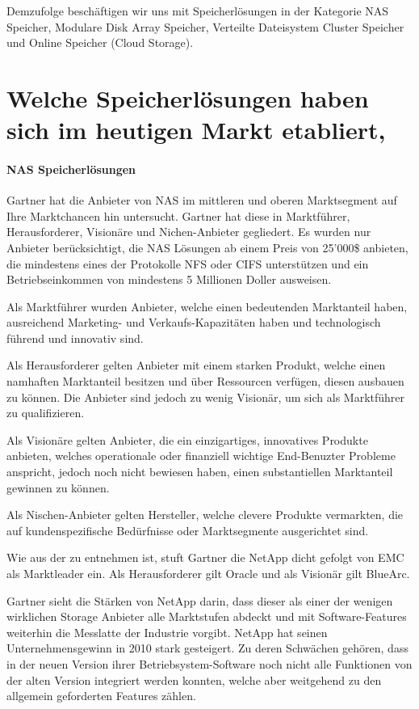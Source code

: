 Demzufolge beschäftigen wir uns mit Speicherlösungen in der Kategorie NAS Speicher, Modulare Disk Array Speicher, Verteilte Dateisystem Cluster Speicher und Online Speicher (Cloud Storage).

\section{Welche Speicherlösungen haben sich im heutigen Markt etabliert, }\label{MarktEtabliert}

\paragraph*{NAS Speicherlösungen}
Gartner hat die Anbieter von NAS im mittleren und oberen Marktsegment auf Ihre Marktchancen hin untersucht. Gartner hat diese in Marktführer, Herausforderer, Visionäre und Nichen-Anbieter gegliedert. Es wurden nur Anbieter berücksichtigt, die NAS Lösungen ab einem Preis von 25'000\$ anbieten, die mindestens eines der Protokolle NFS oder CIFS unterstützen und ein Betriebseinkommen von mindestens 5 Millionen Doller ausweisen. 

Als Marktführer wurden Anbieter, welche einen bedeutenden Marktanteil haben, ausreichend Marketing- und Verkaufs-Kapazitäten haben und technologisch führend und innovativ sind.

Als Herausforderer gelten Anbieter mit einem starken Produkt, welche einen namhaften Marktanteil besitzen und über Ressourcen verfügen, diesen ausbauen zu können. Die Anbieter sind jedoch zu wenig Visionär, um sich als Marktführer zu qualifizieren.

Als Visionäre gelten Anbieter, die ein einzigartiges, innovatives Produkte anbieten, welches operationale oder finanziell wichtige End-Benuzter Probleme anspricht, jedoch noch nicht bewiesen haben, einen substantiellen Marktanteil gewinnen zu können.

Als Nischen-Anbieter gelten Hersteller, welche clevere Produkte vermarkten, die auf kundenspezifische Bedürfnisse oder Marktsegmente ausgerichtet sind.

Wie aus der  zu entnehmen ist, stuft Gartner die NetApp dicht gefolgt von EMC als Marktleader ein. Als Herausforderer gilt Oracle und als Visionär gilt BlueArc.

Gartner sieht die Stärken von NetApp darin, dass dieser als einer der wenigen wirklichen Storage Anbieter alle Marktstufen abdeckt und mit Software-Features weiterhin die Messlatte der Industrie vorgibt. NetApp hat seinen Unternehmensgewinn in 2010 stark gesteigert. Zu deren Schwächen gehören, dass in der neuen Version ihrer Betriebsystem-Software noch nicht alle Funktionen von der alten Version integriert werden konnten, welche aber weitgehend zu den allgemein geforderten Features zählen.

